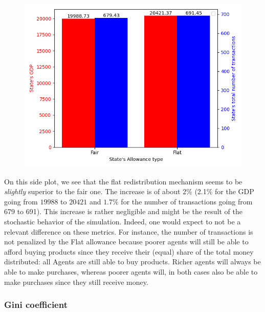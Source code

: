 {{{{{{        \begin{figure}
            \includegraphics[width=\linewidth]{img/exp/8_1.png}
        \end{figure} 
        { On this side plot, we see that the flat redistribution mechanism seems to be \emph{slightly} superior to the fair one. The increase is of about $2\%$ (2.1\% for the GDP going from $19988$ to $20421$ and $1.7\%$ for the number of transactions going from 679 to 691). This increase is rather negligible and might be the result of the stochastic behavior of the simulation. Indeed, one would expect to not be a relevant difference on these metrics. For instance, the number of transactions is not penalized by the Flat allowance because poorer agents will still be able to afford buying products since they receive their (equal) share of the total money distributed: all Agents are still able to buy products. Richer agents will always be able to make purchases, whereas poorer agents will, in both cases also be able to make purchases since they still receive money.
        \par

        \subsubsection{Gini coefficient}

}}}}}}}
